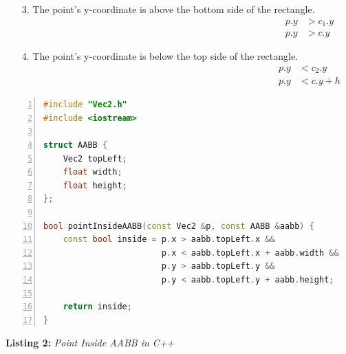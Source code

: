 \begin{multicols}{2}
    \begin{enumerate}
        \item[3.]The point's y-coordinate is above the bottom side of the rectangle.
        \begin{equation*}
            \begin{aligned}
                p.y & > c_1.y \\
                p.y & > c.y
            \end{aligned}
        \end{equation*}

        \item[4.] The point's y-coordinate is below the top side of the rectangle.
            \begin{equation*}
                \begin{aligned}
                    p.y & < c_2.y   \\
                    p.y & < c.y + h
                \end{aligned}
            \end{equation*}
    \end{enumerate}
\end{multicols}
\newpage
\begin{mdframed}[linecolor=black!30!white,linewidth=.5pt,extratopheight=1em]
    \begin{lstlisting}[language=C++, aboveskip=3mm,
        belowskip=3mm,
        showstringspaces=false,
        columns=flexible,
        basicstyle={\small\ttfamily},
        numbers=left,
        numberstyle=\tiny\color{gray},
        keywordstyle=\color{blue},
        commentstyle=\color{dkgreen},
        stringstyle=\color{mauve},
        breaklines=true,
        breakatwhitespace=true,
        tabsize=3,
        xleftmargin=1em]
#include "Vec2.h"
#include <iostream>

struct AABB {
    Vec2 topLeft;
    float width;
    float height;
};

bool pointInsideAABB(const Vec2 &p, const AABB &aabb) {
    const bool inside = p.x > aabb.topLeft.x &&
                        p.x < aabb.topLeft.x + aabb.width &&
                        p.y > aabb.topLeft.y &&
                        p.y < aabb.topLeft.y + aabb.height;

    return inside;
}
\end{lstlisting}

\end{mdframed}
\begin{center}
    \textbf{Listing 2:} \textit{Point Inside AABB in C++}
\end{center}

